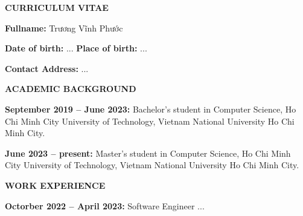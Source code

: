 \newpage
\thispagestyle{empty}

{}
\renewcommand{\refname}{CURRICULUM VITAE}

\begin{center}
    {\Large \textbf{CURRICULUM VITAE}}
\end{center}

\vspace{0.45cm}

\noindent
\textbf{Fullname:} Trương Vĩnh Phước

\vspace{0.18cm}

\noindent
\textbf{Date of birth:} ... \hfill \textbf{Place of birth:} ...

\vspace{0.18cm}

\noindent
\textbf{Contact Address:} ...

\vspace{0.5cm}

\noindent
{\large \textbf{ACADEMIC BACKGROUND}}

\vspace{0.25cm}

\noindent
\textbf{September 2019 -- June 2023:} Bachelor's student in Computer Science, Ho Chi Minh City University of Technology, Vietnam National University Ho Chi Minh City.

\vspace{0.22cm}

\noindent
\textbf{June 2023 -- present:} Master's student in Computer Science, Ho Chi Minh City University of Technology, Vietnam National University Ho Chi Minh City.

\vspace{0.5cm}

\noindent
{\large \textbf{WORK EXPERIENCE}}

\vspace{0.25cm}

\noindent
\textbf{Octorber 2022 -- April 2023:} Software Engineer ...